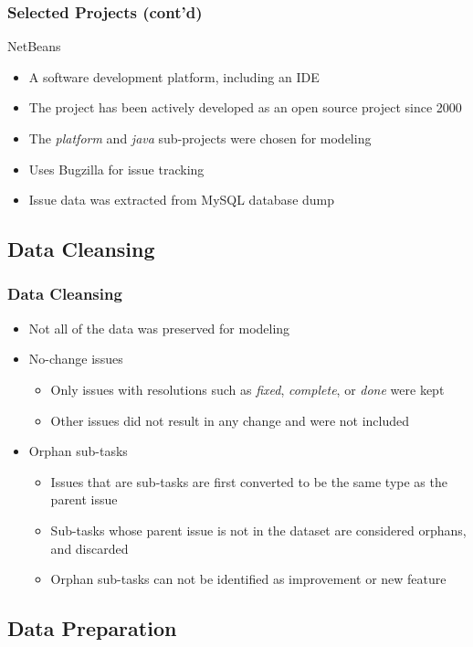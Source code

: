 \documentclass[presentation]{beamer}
\begin{document}
\begin{frame}[t]
\frametitle{Selected Projects (cont'd)}
NetBeans
\begin{itemize}
\item{A software development platform, including an IDE}
\item{The project has been actively developed as an open source project since 2000}
\item{The \textit{platform} and \textit{java} sub-projects were chosen for modeling}
\item{Uses Bugzilla for issue tracking}
\item{Issue data was extracted from MySQL database dump}
\end{itemize}
\end{frame}

\subsection{Data Cleansing}

\begin{frame}[t]
\frametitle{Data Cleansing}
\begin{itemize}
\item{Not all of the data was preserved for modeling}
\item{No-change issues
  \begin{itemize}
  \item{Only issues with resolutions such as \textit{fixed}, \textit{complete}, or \textit{done} were kept}
  \item{Other issues did not result in any change and were not included}  
  \end{itemize}
}
\item{Orphan sub-tasks
  \begin{itemize}
  \item{Issues that are sub-tasks are first converted to be the same type as the parent issue}
  \item{Sub-tasks whose parent issue is not in the dataset are considered orphans, and discarded}
  \item{Orphan sub-tasks can not be identified as improvement or new feature}
  \end{itemize}
}
\end{itemize}
\end{frame}

\subsection{Data Preparation}
\end{document}
